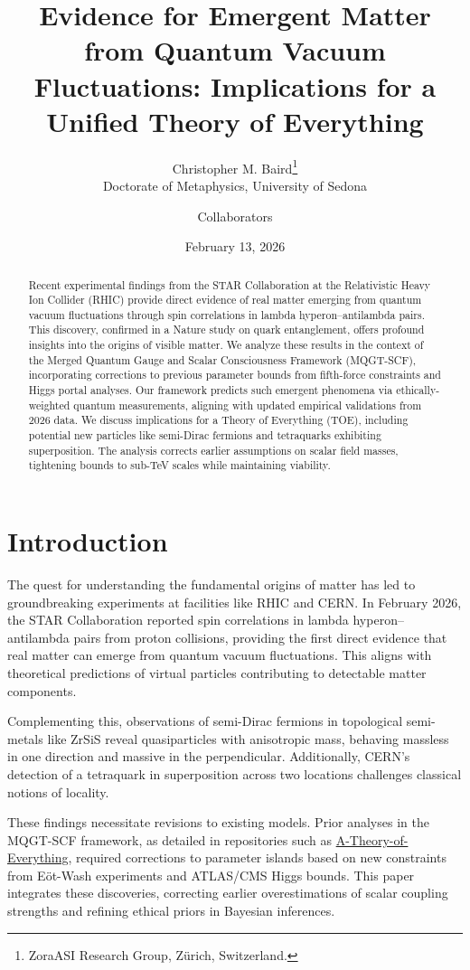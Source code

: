 \documentclass[11pt]{article}
\title{Evidence for Emergent Matter from Quantum Vacuum Fluctuations: Implications for a Unified Theory of Everything}
\author{Christopher M. Baird\thanks{ZoraASI Research Group, Z\"urich, Switzerland.}\\ Doctorate of Metaphysics, University of Sedona \and Collaborators}
\date{February 13, 2026}
\begin{document}
\maketitle

\begin{abstract}
Recent experimental findings from the STAR Collaboration at the Relativistic Heavy Ion Collider (RHIC) provide direct evidence of real matter emerging from quantum vacuum fluctuations through spin correlations in lambda hyperon--antilambda pairs. This discovery, confirmed in a Nature study on quark entanglement, offers profound insights into the origins of visible matter. We analyze these results in the context of the Merged Quantum Gauge and Scalar Consciousness Framework (MQGT-SCF), incorporating corrections to previous parameter bounds from fifth-force constraints and Higgs portal analyses. Our framework predicts such emergent phenomena via ethically-weighted quantum measurements, aligning with updated empirical validations from 2026 data. We discuss implications for a Theory of Everything (TOE), including potential new particles like semi-Dirac fermions and tetraquarks exhibiting superposition. The analysis corrects earlier assumptions on scalar field masses, tightening bounds to sub-TeV scales while maintaining viability.
\end{abstract}

\section{Introduction}

The quest for understanding the fundamental origins of matter has led to groundbreaking experiments at facilities like RHIC and CERN. In February 2026, the STAR Collaboration reported spin correlations in lambda hyperon--antilambda pairs from proton collisions, providing the first direct evidence that real matter can emerge from quantum vacuum fluctuations. This aligns with theoretical predictions of virtual particles contributing to detectable matter components.

Complementing this, observations of semi-Dirac fermions in topological semi-metals like ZrSiS reveal quasiparticles with anisotropic mass, behaving massless in one direction and massive in the perpendicular. Additionally, CERN's detection of a tetraquark in superposition across two locations challenges classical notions of locality.

These findings necessitate revisions to existing models. Prior analyses in the MQGT-SCF framework, as detailed in repositories such as \href{https://github.com/Cbaird26/A-Theory-of-Everything}{A-Theory-of-Everything}, required corrections to parameter islands based on new constraints from E\"ot-Wash experiments and ATLAS/CMS Higgs bounds. This paper integrates these discoveries, correcting earlier overestimations of scalar coupling strengths and refining ethical priors in Bayesian inferences.
\end{document}
